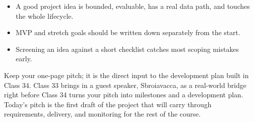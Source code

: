\classclosingframe
{\begin{itemize}
\item A good project idea is bounded, evaluable, has a real data path, and touches the whole lifecycle.
\item MVP and stretch goals should be written down separately from the start.
\item Screening an idea against a short checklist catches most scoping mistakes early.
\end{itemize}}
{Keep your one-page pitch; it is the direct input to the development plan built in Class 34.}
{Class 33 brings in a guest speaker, Sbroiavacca, as a real-world bridge right before Class 34 turns your pitch into milestones and a development plan.}
{Today's pitch is the first draft of the project that will carry through requirements, delivery, and monitoring for the rest of the course.}


